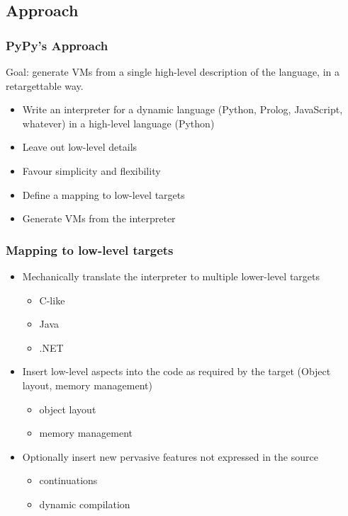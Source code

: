 \documentclass[utf8]{beamer}
\begin{document}
\subsection{Approach}
\begin{frame}
  \frametitle{PyPy's Approach}
    \alert{Goal:} generate VMs from a single high-level description of the
     language, in a retargettable way.
  \begin{itemize}
  \item
    Write an  interpreter for a dynamic language (Python, Prolog, JavaScript,
    whatever) in a high-level language (Python)
  \item
    Leave out low-level details
  \item
    Favour simplicity and flexibility
  \item
    Define a mapping to low-level targets
  \item
    Generate VMs from the interpreter
  \end{itemize}
\end{frame}


\begin{frame}
  \frametitle{Mapping to low-level targets}
  \begin{itemize}
  \item
    Mechanically translate the interpreter to multiple
    lower-level targets
    \begin{itemize}
    \item C-like
    \item Java
    \item .NET
    \end{itemize}
  \item
    Insert low-level aspects into the code as required by
    the target (Object layout, memory management)
    \begin{itemize}
    \item object layout
    \item memory management
    \end{itemize}  \item
    Optionally insert new pervasive features not expressed
    in the source
    \begin{itemize}
    \item continuations
    \item dynamic compilation
    \end{itemize}
  \end{itemize}
\end{frame}
\end{document}
